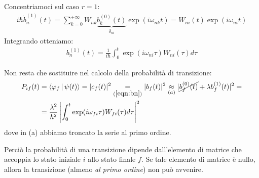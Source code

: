 \documentclass[../../InformazioneQuantistica.tex]{subfiles}
\begin{document}
Concentriamoci sul caso $r=1$:
\begin{align*}
    i\hbar \dot{b}_n^{(1)}(t) = \sum_{k=0}^{+\infty} W_{nk} \underbrace{b_k^{(0)}(t)}_{\delta_{ni}} \exp(i\omega_{nk}t) = W_{ni}(t) \exp(i\omega_{ni}t)
\end{align*}
Integrando otteniamo:
\begin{align}
    b_n^{(1)}(t) = \frac{1}{i\hbar} \int_0^t \exp(i\omega_{ni}\tau) W_{ni}(\tau) d\tau
    \label{eqn:bn1}
\end{align}

Non resta che sostituire nel calcolo della probabilità di transizione:
\begin{align} \nonumber
P_{if}(t) &= \Braket{\varphi_f | \psi(t)} = |c_f(t)|^2 \underset{(\ref{eqn:bn})}{=} |b_f(t)|^2 \underset{(a)}{\approx} |\cancel{b_f^{(0)}(t)} + \lambda b_f^{(1)}(t)|^2 =\\
&= \frac{\lambda^2}{\hbar^2} \left| \int_0^t \exp(i\omega_{fi}\tau) W_{fi}(\tau)d\tau \right|^2 \label{eqn:Pif-final}
\end{align}
dove in (a) abbiamo troncato la serie al primo ordine.


Perciò la probabilità di una transizione dipende dall'elemento di matrice che accoppia lo stato iniziale $i$ allo stato finale $f$. Se tale elemento di matrice è nullo, allora la transizione (almeno \textit{al primo ordine}) non può avvenire.
\end{document}
